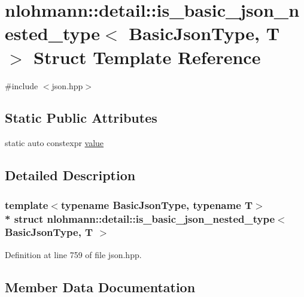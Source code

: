 \hypertarget{structnlohmann_1_1detail_1_1is__basic__json__nested__type}{}\section{nlohmann\+:\+:detail\+:\+:is\+\_\+basic\+\_\+json\+\_\+nested\+\_\+type$<$ Basic\+Json\+Type, T $>$ Struct Template Reference}
\label{structnlohmann_1_1detail_1_1is__basic__json__nested__type}


{\ttfamily \#include $<$json.\+hpp$>$}

\subsection*{Static Public Attributes}
\begin{DoxyCompactItemize}
\item 
static auto constexpr \hyperlink{structnlohmann_1_1detail_1_1is__basic__json__nested__type_aee5fee744e5298a78d557f2ee5f090db}{value}
\end{DoxyCompactItemize}


\subsection{Detailed Description}
\subsubsection*{template$<$typename Basic\+Json\+Type, typename T$>$\\*
struct nlohmann\+::detail\+::is\+\_\+basic\+\_\+json\+\_\+nested\+\_\+type$<$ Basic\+Json\+Type, T $>$}



Definition at line 759 of file json.\+hpp.



\subsection{Member Data Documentation}

